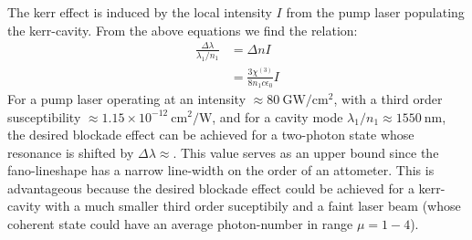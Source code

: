 \documentclass[12pt]{article}
\begin{document}
The kerr effect is induced by the local intensity $I$ from the pump laser populating
the kerr-cavity. From the above equations we find the relation:
\begin{equation}
\begin{split}
\frac{\Delta \lambda}{\lambda_1 / n_1} &= \Delta n I \\
&= \frac{3 \chi^{(3)}}{8 n_1 c\epsilon_0} I
\end{split}
\end{equation}
For a pump laser operating at an intensity $\approx 80 \:\mathrm{GW/cm^{2}}$, with 
a third order susceptibility $\approx 1.15 \times 10^{-12} \:\mathrm{cm}^2/\mathrm{W}$, 
\cite{qin2010design} and for a cavity mode $\lambda_{1}/{n_1} \approx 1550 \:\mathrm{nm}$, the desired blockade effect can be achieved for a two-photon state whose resonance is 
shifted by $\Delta\lambda \approx $. This value serves as an upper bound since the 
fano-lineshape has a narrow line-width on the order of an attometer. This is advantageous
because the desired blockade effect could be achieved for a kerr-cavity with a much 
smaller third order suceptibily and a faint laser beam (whose coherent state could have 
an average photon-number in range $\mu = 1-4$).

\newpage


\end{document}
